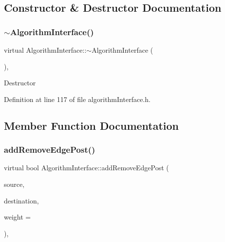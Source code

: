 \subsection{Constructor \& Destructor Documentation}
\mbox{\label{classAlgorithmInterface_a240e65a4c0c5bdca207abf39733fe3fc}} 
\subsubsection{\texorpdfstring{$\sim$\+Algorithm\+Interface()}{~AlgorithmInterface()}}
{\footnotesize\ttfamily virtual Algorithm\+Interface\+::$\sim$\+Algorithm\+Interface (\begin{DoxyParamCaption}{ }\end{DoxyParamCaption})\hspace{0.3cm}{\ttfamily [inline]}, {\ttfamily [virtual]}}

Destructor 

Definition at line 117 of file algorithm\+Interface.\+h.



\subsection{Member Function Documentation}
\mbox{\label{classAlgorithmInterface_ac97ed4df4fd2b14b16d55c1b3b9749b6}} 
\subsubsection{\texorpdfstring{add\+Remove\+Edge\+Post()}{addRemoveEdgePost()}}
{\footnotesize\ttfamily virtual bool Algorithm\+Interface\+::add\+Remove\+Edge\+Post (\begin{DoxyParamCaption}\item[{const \hyperlink{edge_8h_a5fbd20c46956d479cb10afc9855223f6}{type\+Vertex} \&}]{source,  }\item[{const \hyperlink{edge_8h_a5fbd20c46956d479cb10afc9855223f6}{type\+Vertex} \&}]{destination,  }\item[{const \hyperlink{edge_8h_a2e7ea3be891ac8b52f749ec73fee6dd2}{type\+Weight} \&}]{weight = {} }\end{DoxyParamCaption})\hspace{0.3cm}{\ttfamily [protected]}, {}}

